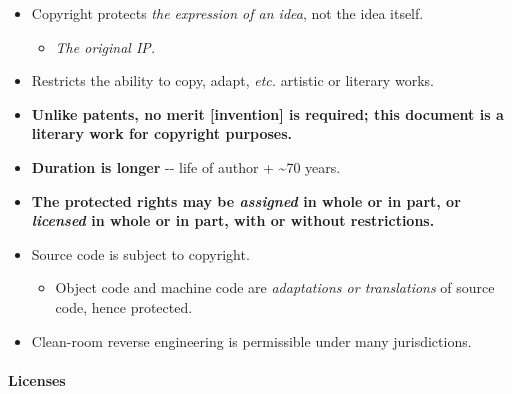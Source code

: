 \documentclass[a4paper]{article}
\providecommand{\tightlist}{%
  \setlength{\itemsep}{0pt}\setlength{\parskip}{0pt}}
\let\oldparagraph\paragraph
\renewcommand{\paragraph}[1]{\oldparagraph{#1}\mbox{}}
\begin{document}
\begin{itemize}
\item
  Copyright protects \emph{the expression of an idea}, not the idea
  itself.

  \begin{itemize}
  \tightlist
  \item
    \emph{The original IP.}
  \end{itemize}
\item
  Restricts the ability to copy, adapt, \emph{etc.} artistic or literary
  works.
\item
  \textbf{Unlike patents, no merit {[}invention{]} is required; this
  document is a literary work for copyright purposes.}
\item
  \textbf{Duration is longer} -\/- life of author + \textasciitilde{}70
  years.
\item
  \textbf{The protected rights may be \emph{assigned} in whole or in
  part, or \emph{licensed} in whole or in part, with or without
  restrictions.}
\item
  Source code is subject to copyright.

  \begin{itemize}
  \tightlist
  \item
    Object code and machine code are \emph{adaptations or translations}
    of source code, hence protected.
  \end{itemize}
\item
  Clean-room reverse engineering is permissible under many
  jurisdictions.
\end{itemize}

\hypertarget{licenses}{%
\paragraph{Licenses}\label{licenses}}
\end{document}

